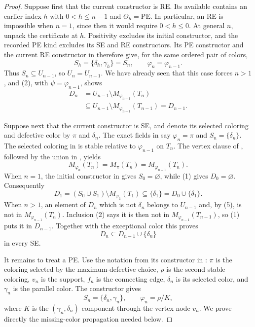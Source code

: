 \begin{proof}
Suppose first that the current constructor is RE.  Its available
 contains an earlier index
\(h\) with \(0<h\leq n-1\) and \(\Theta_h=\mathrm{PE}\).  In particular,
an RE is impossible when \(n=1\), since then it would require
\(0<h\leq0\).  At general \(n\), unpack the
 certificate at \(h\).  Positivity excludes its
initial constructor, and the recorded PE kind excludes its SE and RE
constructors.  Its PE constructor and the current RE constructor in
 therefore give, for the same ordered pair of
colors,
\[
 S_h=\{\delta_h,\gamma_h\}=S_n,
 \qquad \varphi_n=\varphi_{n-1}.                                \tag{3}
\]
Thus \(S_n\subseteq U_{n-1}\), so \(U_n=U_{n-1}\).  We have already
seen that this case forces \(n>1\), and (2), with
\(\psi=\varphi_{n-1}\), shows
\[
\begin{aligned}
 D_n
 &=U_{n-1}\setminus M_{\varphi_{n-1}}(T_n)\\
 &\subseteq U_{n-1}\setminus M_{\varphi_{n-1}}(T_{n-1})
  =D_{n-1}.                                                      \tag{4}
\end{aligned}
\]

Suppose next that the current constructor is SE, and denote its selected
coloring and defective color by \(\pi\) and \(\delta_n\).  The exact
fields in  say
\(\varphi_n=\pi\) and \(S_n=\{\delta_n\}\).  The selected coloring in
 is stable relative to
\(\varphi_{n-1}\) on \(T_n\).  The vertex clause of
, followed by the union in
, yields
\[
 M_{\varphi_n}(T_n)=M_\pi(T_n)=M_{\varphi_{n-1}}(T_n).          \tag{5}
\]
When \(n=1\), the initial constructor in
 gives \(S_0=\varnothing\), while (1) gives
\(D_0=\varnothing\).  Consequently
\[
 D_1=(S_0\cup S_1)\setminus M_{\varphi_1}(T_1)
     \subseteq\{\delta_1\}=D_0\cup\{\delta_1\}.                \tag{6}
\]
When \(n>1\), an element of \(D_n\) which is not \(\delta_n\) belongs
to \(U_{n-1}\) and, by (5), is not in
\(M_{\varphi_{n-1}}(T_n)\).  Inclusion (2) says it is then not in
\(M_{\varphi_{n-1}}(T_{n-1})\), so (1) puts it in \(D_{n-1}\).
Together with the exceptional color this proves
\[
 D_n\subseteq D_{n-1}\cup\{\delta_n\}                           \tag{7}
\]
in every SE.

It remains to treat a PE.  Use the notation from its constructor in
: \(\pi\) is the coloring selected by the
maximum-defective choice, \(\rho\) is the second stable coloring,
\(v_n\) is the support, \(f_n\) is the connecting edge,
\(\delta_n\) is its selected color, and \(\gamma_n\) is the parallel
color.  The constructor gives
\[
 S_n=\{\delta_n,\gamma_n\},
 \qquad
 \varphi_n=\rho/K,                                              \tag{8}
\]
where \(K\) is the \((\gamma_n,\delta_n)\)-component through the
vertex-node \(v_n\).  We prove directly the missing-color propagation
needed below.


\end{proof}
